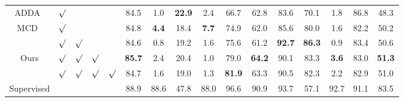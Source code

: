 \documentclass{article}
\begin{document}
\begin{table*}[t]
{\begin{threeparttable}
\begin{tabular}{ccccc ccccc cccccc}
\multicolumn{1}{c}{ADDA~\cite{tzeng2017adversarial}} &{$\surd$}  &\multicolumn{1}{c}{}  &\multicolumn{1}{c}{} &\multicolumn{1}{c}{} &\multicolumn{1}{c}{84.5} &\multicolumn{1}{c}{1.0} &\multicolumn{1}{c}{\textbf{22.9}}  &\multicolumn{1}{c}{2.4} &\multicolumn{1}{c}{66.7}&\multicolumn{1}{c}{62.8} &\multicolumn{1}{c}{83.6}  &\multicolumn{1}{c}{70.1} &\multicolumn{1}{c}{1.8}&\multicolumn{1}{c}{86.8}  &\multicolumn{1}{c}{48.3}\\

\multicolumn{1}{c}{MCD~\cite{saito2018maximum}} &{$\surd$}  &\multicolumn{1}{c}{}  &\multicolumn{1}{c}{} &\multicolumn{1}{c}{} &\multicolumn{1}{c}{84.8} &\multicolumn{1}{c}{\textbf{4.4}} &\multicolumn{1}{c}{18.4}  &\multicolumn{1}{c}{\textbf{7.7}} &\multicolumn{1}{c}{74.9}&\multicolumn{1}{c}{62.0} &\multicolumn{1}{c}{85.6}  &\multicolumn{1}{c}{80.0} &\multicolumn{1}{c}{1.6}&\multicolumn{1}{c}{82.2}  &\multicolumn{1}{c}{50.2}\\
\toprule
\multicolumn{1}{c}{ } &{$\surd$}  &\multicolumn{1}{c}{$\surd$}  &\multicolumn{1}{c}{} &\multicolumn{1}{c}{} &\multicolumn{1}{c}{84.6} &\multicolumn{1}{c}{0.8} &\multicolumn{1}{c}{19.2}  &\multicolumn{1}{c}{1.6} &\multicolumn{1}{c}{75.6}&\multicolumn{1}{c}{61.2} &\multicolumn{1}{c}{\textbf{92.7}}  &\multicolumn{1}{c}{\textbf{86.3}} &\multicolumn{1}{c}{0.9} &\multicolumn{1}{c}{83.4}  &\multicolumn{1}{c}{50.6}\\

\multicolumn{1}{c}{Ours} &{$\surd$}  &\multicolumn{1}{c}{$\surd$}  &\multicolumn{1}{c}{$\surd$} &\multicolumn{1}{c}{} &\multicolumn{1}{c}{\textbf{85.7}} &\multicolumn{1}{c}{2.4} &\multicolumn{1}{c}{20.4}  &\multicolumn{1}{c}{1.0} &\multicolumn{1}{c}{79.0}&\multicolumn{1}{c}{\textbf{64.2}} &\multicolumn{1}{c}{90.1}  &\multicolumn{1}{c}{83.3} &\multicolumn{1}{c}{\textbf{3.6}} &\multicolumn{1}{c}{83.0}  &\multicolumn{1}{c}{\textbf{51.3}}\\

\multicolumn{1}{c}{ } &{$\surd$}  &\multicolumn{1}{c}{$\surd$}  &\multicolumn{1}{c}{$\surd$} &\multicolumn{1}{c}{$\surd$} &\multicolumn{1}{c}{84.7} &\multicolumn{1}{c}{1.6} &\multicolumn{1}{c}{19.0}  &\multicolumn{1}{c}{1.3} &\multicolumn{1}{c}{\textbf{81.9}}&\multicolumn{1}{c}{63.3} &\multicolumn{1}{c}{90.5}  &\multicolumn{1}{c}{82.3} &\multicolumn{1}{c}{2.2} &\multicolumn{1}{c}{82.9} &\multicolumn{1}{c}{51.0}\\
\toprule
\multicolumn{1}{c}{Supervised} &{}  &\multicolumn{1}{c}{}  &\multicolumn{1}{c}{} &\multicolumn{1}{c}{} &\multicolumn{1}{c}{88.9} &\multicolumn{1}{c}{88.6} &\multicolumn{1}{c}{47.8}  &\multicolumn{1}{c}{88.0} &\multicolumn{1}{c}{96.6}&\multicolumn{1}{c}{90.9} &\multicolumn{1}{c}{93.7}  &\multicolumn{1}{c}{57.1} &\multicolumn{1}{c}{92.7} &\multicolumn{1}{c}{91.1}  &\multicolumn{1}{c}{83.5}\\
\bottomrule  \end{tabular}
\renewcommand{\labelitemi}{}
\end{threeparttable}
}

\end{table*}
\end{document}
